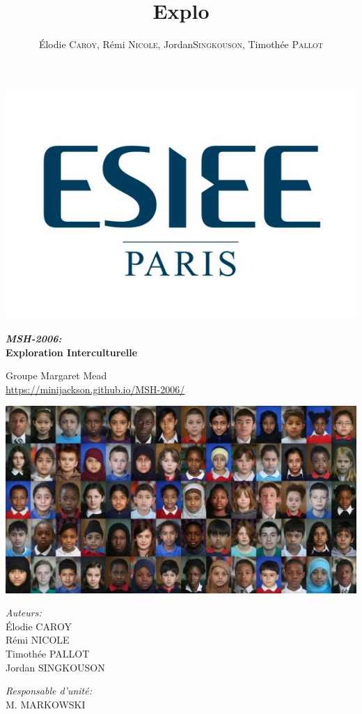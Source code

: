 \documentclass[12pt,twoside]{book}
\title{Explo}
\author{\'Elodie \textsc{Caroy}, Rémi \textsc{Nicole}, Jordan\textsc{Singkouson}, Timothée \textsc{Pallot}}
\date{}
\newcommand{\hsc}[1]{{\footnotesize\MakeUppercase{#1}}}
\begin{document}
\begin{titlepage}
	\begin{sffamily}
	\includegraphics[scale=0.3]{esiee.jpg}
	\begin{center}

	\vspace*{2cm}
	{\huge \bfseries \emph{MSH-2006:}\\
	Exploration Interculturelle \\[0.4cm]}
	\begin{center}
		\Large{Groupe Margaret Mead}\\
		\large{\url{https://minijackson.github.io/MSH-2006/}}
	\end{center}

	\includegraphics[scale=0.8]{races-620x330.jpg}
	\newline

	\begin{minipage}{0.4\textwidth}
	  \begin{flushleft} \large
				\emph{Auteurs:}\\
		Élodie C\hsc{aroy}\\
				Rémi N\hsc{icole}\\
				Timothée P\hsc{allot}\\
				Jordan S\hsc{ingkouson}
	  \end{flushleft}
	\end{minipage}
	\begin{minipage}{0.4\textwidth}
	  \begin{flushright} \large
		\emph{Responsable d'unité:}\\
				M. M\hsc{arkowski}\\


\end{flushright}
\end{minipage}
\end{center}
\end{sffamily}
\end{titlepage}
\end{document}
